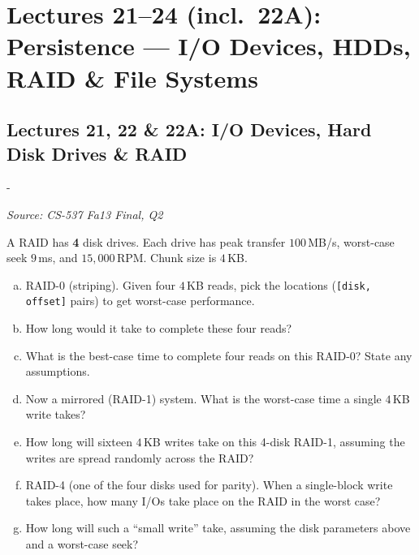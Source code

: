 \documentclass[11pt,a4paper]{article}
\makeatletter
\newcommand{\keepspace}[1]{\par\penalty-100\begingroup
  \setlength{\dimen@}{#1}\dimen@ii\pagegoal\advance\dimen@ii-\pagetotal
  \ifdim\dimen@>\dimen@ii\ifdim\dimen@ii>\z@\vfil\fi\break\fi\endgroup}
\newcounter{qn}[section]
\newenvironment{Qn}[4]{%
  \refstepcounter{qn}\keepspace{7\baselineskip}%
  \begin{tcolorbox}[qboxstyle, title={Q\thesection.\theqn\ \ [#1 \textbar\ #2]\ \ #4}]%
  {\footnotesize\color{g3}\textit{Source: #3}}\par\smallskip%
}{%
  \end{tcolorbox}%
}
\makeatother
\begin{document}
\clearpage

\section{Lectures 21--24 (incl.\ 22A): Persistence --- I/O Devices, HDDs, RAID \& File Systems}

\subsection{Lectures 21, 22 \& 22A: I/O Devices, Hard Disk Drives \& RAID}

\begin{Qn}{Hard}{Lect 22A}{CS-537 Fa13 Final, Q2}{Worst-case RAID-0/1/4 time with real disk parameters}
A RAID has \textbf{4} disk drives. Each drive has peak transfer
$100$\,MB/s, worst-case seek $9$\,ms, and $15{,}000$\,RPM. Chunk size is
$4$\,KB.
\begin{enumerate}[(a)]
\item RAID-0 (striping). Given four $4$\,KB reads, pick the locations
      (\texttt{[disk, offset]} pairs) to get worst-case performance.
\item How long would it take to complete these four reads?
\item What is the best-case time to complete four reads on this RAID-0?
      State any assumptions.
\item Now a mirrored (RAID-1) system. What is the worst-case time a
      single $4$\,KB write takes?
\item How long will sixteen $4$\,KB writes take on this 4-disk RAID-1,
      assuming the writes are spread randomly across the RAID?
\item RAID-4 (one of the four disks used for parity). When a single-block
      write takes place, how many I/Os take place on the RAID in the
      worst case?
\item How long will such a ``small write'' take, assuming the disk
      parameters above and a worst-case seek?
\end{enumerate}
\end{Qn}
\end{document}
